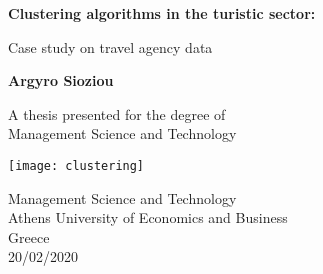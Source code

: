 \begin{titlepage}
    \begin{center}
        \vspace*{1cm}
 
        \Huge
        \textbf{Clustering algorithms in the turistic sector:}
 
        \vspace{0.5cm}
        \LARGE
        Case study on travel agency data
 
        \vspace{1.5cm}
 
        \textbf{Argyro Sioziou}
 
        \vfill
 
        A thesis presented for the degree of\\
        Management Science and Technology
 
        \vspace{0.8cm}

	\texttt{[image: clustering]}

	\vspace{0.8cm}

        \Large
        Management Science and Technology\\
        Athens University of Economics and Business\\
        Greece\\
        20/02/2020
 
    \end{center}
\end{titlepage}